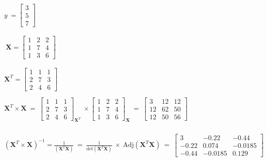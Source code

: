 \documentclass[10pt]{article}
\begin{document}
\begin{gather*}
y\ =\begin{bmatrix}
3\\
5\\
7
\end{bmatrix}\\
\\
\\
\ \boldsymbol{X}=\begin{bmatrix}
1 & 2 & 2\\
1 & 7 & 4\\
1 & 3 & 6
\end{bmatrix}\\
\\
\\
\boldsymbol{X}^{T} =\begin{bmatrix}
1 & 1 & 1\\
2 & 7 & 3\\
2 & 4 & 6
\end{bmatrix}\\
\\
\boldsymbol{X}^{T} \times \boldsymbol{X}\ =\ \begin{bmatrix}
1 & 1 & 1\\
2 & 7 & 3\\
2 & 4 & 6
\end{bmatrix}_{\boldsymbol{X}^{T}} \ \times \begin{bmatrix}
1 & 2 & 2\\
1 & 7 & 4\\
1 & 3 & 6
\end{bmatrix}_{\boldsymbol{X}} \ =\ \begin{bmatrix}
3 & 12 & 12\\
12 & 62 & 50\\
12 & 50 & 56
\end{bmatrix}\\
\\
\\
\\
\left( \boldsymbol{X}^{T} \times \boldsymbol{X}\right)^{-1} =\frac{1}{\left( \boldsymbol{X}^{T} \boldsymbol{X}\right)} \ =\ \frac{1}{\text{det}\left( \boldsymbol{X}^{T} \boldsymbol{X}\right)} \ \times \ \text{Adj}\left( \boldsymbol{X}^{T} \boldsymbol{X}\right) \ =\ \begin{bmatrix}
3 & -0.22 & -0.44\\
-0.22 & 0.074 & -0.0185\\
-0.44 & -0.0185 & 0.129
\end{bmatrix}\\

\end{gather*}
\end{document}
